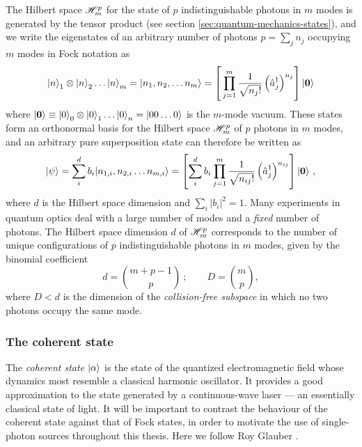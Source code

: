 The Hilbert space $\mathscr{H}_m^p$ for the state of $p$ indistinguishable photons in $m$ modes is generated by the tensor product (see section \ref{sec:quantum-mechanics-states}), and we write the eigenstates of an arbitrary number of photons $p=\sum_j n_j$ occupying $m$ modes in Fock notation as 
\begin{equation}
    \mbox{$ | n \rangle $}_1 \otimes \mbox{$ | n \rangle $}_2 \ldots  \mbox{$ | n \rangle $}_m    = \mbox{$ | n_1, n_2, \ldots n_m \rangle $} = 
    \left[\,
    \prod_{j=1}^m 
    \frac{1}{\sqrt{n_j!}}
    \left( \hat{a}^{\dagger}_{j} \right) ^{n_j} 
    \right]
    \mbox{$ | \mathbf{0} \rangle $}   
    \label{eqn:fock-notation}
\end{equation}
where $\mbox{$ | \mathbf{0} \rangle $} \equiv \mbox{$ | 0 \rangle $}_0 \otimes \mbox{$ | 0 \rangle $}_1 \ldots \mbox{$ | 0 \rangle $}_n = \mbox{$ | 00 \ldots0 \rangle $}$ is the $m$-mode vacuum. 
These states form an orthonormal basis for the Hilbert space $\mathscr{H}_m^p$ of $p$ photons in $m$ modes, and an arbitrary pure superposition state can therefore be written as
\begin{equation}
    \mbox{$ | \psi \rangle $} = 
    \sum_i^d
    b_i 
    \mbox{$ | n_{1,i}, n_{2,i} \ldots n_{m,i} \rangle $}
    =
    \left[
    \sum_i^d
    b_i 
    \prod_{j=1}^m 
    \frac{1}{\sqrt{n_{ij}!}}
    \left( \hat{a}^{\dagger}_{j} \right) ^{n_{ij}} 
    \right]
    \mbox{$ | \mathbf{0} \rangle $} ~, 
    \label{eqn:fock-superposition}
\end{equation}
where $d$ is the Hilbert space dimension and $\sum_i{|b_i|^2} = 1$. 
Many experiments in quantum optics deal with a large number of modes and a \emph{fixed} number of photons. 
The Hilbert space dimension $d$ of $\mathscr{H}_m^p$ corresponds to the number of unique configurations of $p$ indistinguishable photons in $m$ modes, given by the binomial coefficient
\begin{equation}
    d=\binom{m+p-1}{p} ~;\qquad D=\binom{m}{p},
\end{equation}
where $D<d$ is the dimension of the \emph{collision-free subspace} in which no two photons occupy the same mode.  


\subsubsection{The coherent state}
\label{sec:coherent-state}
The \emph{coherent state} $\mbox{$ | \alpha \rangle $}$ is the state of the quantized electromagnetic field whose dynamics most resemble a classical harmonic oscillator. It provides a good approximation to the state generated by a continuous-wave laser --- an essentially classical state of light. It will be important to contrast the behaviour of the coherent state against that of Fock states, in order to motivate the use of single-photon sources throughout this thesis. Here we follow Roy Glauber \cite{Glauber1963a}.


